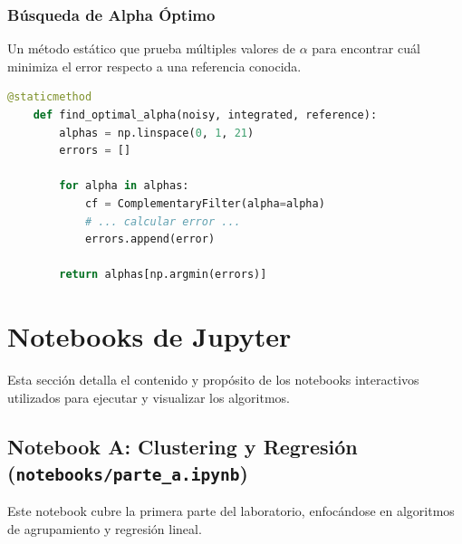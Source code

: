 \documentclass[12pt, a4paper]{article}
\begin{document}
\subsubsection{Búsqueda de Alpha Óptimo}
Un método estático que prueba múltiples valores de $\alpha$ para encontrar cuál minimiza el error respecto a una referencia conocida.
\begin{lstlisting}[language=Python]
    @staticmethod
    def find_optimal_alpha(noisy, integrated, reference):
        alphas = np.linspace(0, 1, 21)
        errors = []
        
        for alpha in alphas:
            cf = ComplementaryFilter(alpha=alpha)
            # ... calcular error ...
            errors.append(error)
        
        return alphas[np.argmin(errors)]
\end{lstlisting}

\newpage
\section{Notebooks de Jupyter}
Esta sección detalla el contenido y propósito de los notebooks interactivos utilizados para ejecutar y visualizar los algoritmos.

\subsection{Notebook A: Clustering y Regresión (\texttt{notebooks/parte\_a.ipynb})}
Este notebook cubre la primera parte del laboratorio, enfocándose en algoritmos de agrupamiento y regresión lineal.
\end{document}
